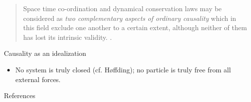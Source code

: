 \documentclass[fleqn]{beamer}
\begin{document}
\begin{frame}

  \begin{quote} Space time co-ordination and dynamical conservation
    laws may be considered as \emph{two complementary aspects of
      ordinary causality} which in this field exclude one another to a
    certain extent, although neither of them has lost its intrinsic
    validity. \citep[p 376]{faraday1932}. \end{quote}


\end{frame}

\begin{frame}{Causality as an idealization}

  \begin{itemize}
  \item No system is truly closed (cf. Høffding); no particle is truly
    free from all external forces.
  \end{itemize}

    


\end{frame}

\begin{frame}[allowframebreaks]{References}

\printbibliography[heading=none]

\end{frame}
\end{document}
